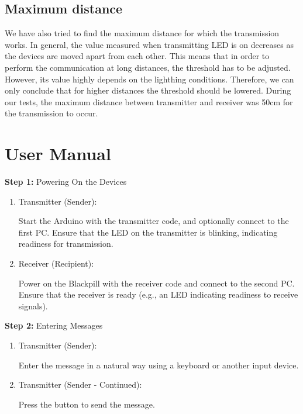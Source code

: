 \documentclass[12pt]{article}
\begin{document}
  \subsection{Maximum distance}
  We have also tried to find the maximum distance for which the transmission works. In general, the value measured when transmitting LED is on decreases
  as the devices are moved apart from each other. This means that in order to perform the communication at long distances, the threshold has to be adjusted.
  However, its value highly depends on the lighthing conditions. Therefore, we can only conclude that for higher distances the threshold should be lowered.
  During our tests, the maximum distance between transmitter and receiver was 50cm for the transmission to occur.

	
  \newpage
	\section{User Manual}
  \textbf{Step 1:} Powering On the Devices

  \begin{enumerate}[label=\alph*).]
    \item Transmitter (Sender):

Start the Arduino with the transmitter code, and optionally connect to the first PC.
Ensure that the LED on the transmitter is blinking, indicating readiness for transmission.

\item Receiver (Recipient):

Power on the Blackpill with the receiver code and connect to the second PC.
Ensure that the receiver is ready (e.g., an LED indicating readiness to receive signals).
  \end{enumerate}


\noindent\textbf{Step 2:} Entering Messages
\begin{enumerate}
  \item Transmitter (Sender):

  Enter the message in a natural way using a keyboard or another input device.

\item Transmitter (Sender - Continued):

Press the button to send the message.
\end{enumerate}
\end{document}
